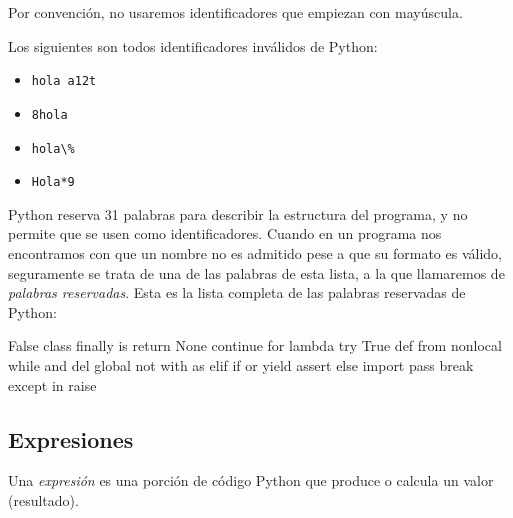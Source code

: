 \begin{observacion}
Por convención, no usaremos identificadores que empiezan con mayúscula.
\end{observacion}

Los siguientes son todos identificadores inválidos de Python:

\begin{itemize}
\item \lstinline!hola a12t!
\item \lstinline!8hola!
\item \lstinline!hola\%!
\item \lstinline!Hola*9!
\end{itemize}

Python reserva 31 palabras para describir la estructura del
programa, y no permite que se usen como identificadores. Cuando en
un programa nos encontramos con que un nombre no es admitido pese
a que su formato es válido, seguramente se trata de una de las
palabras de esta lista, a la que llamaremos de {\it palabras
reservadas}. Esta es la lista completa de las palabras reservadas de
Python:

\begin{codigo-nohl-sn}
False      class      finally    is         return
None       continue   for        lambda     try
True       def        from       nonlocal   while
and        del        global     not        with
as         elif       if         or         yield
assert     else       import     pass
break      except     in         raise
\end{codigo-nohl-sn}

\subsection{Expresiones}
Una {\it expresión} es una porción de código Python que produce o
calcula un valor (resultado).

